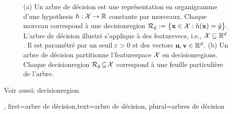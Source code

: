{{\begin{figure}[H]
\begin{minipage}{.45\textwidth}
			\end{minipage}
			\caption{(a) Un arbre de décision est une représentation en organigramme d'une \gls{hypothesis} $h: \mathcal{X} \rightarrow \mathbb{R}$ constante par morceaux.  
				Chaque morceau correspond à une \gls{decisionregion} $\mathcal{R}_{\hat{y}} := \big\{ {\bf x} \in  \mathcal{X}: h({\bf x}) = \hat{y} \big\}$. 
				L'arbre de décision illustré s'applique à des \glspl{featurevec}, i.e., $\mathcal{X} \subseteq \mathbb{R}^{d}$. Il est paramétré par un seuil $\varepsilon>0$ et des \glspl{vector} ${\bf u}, {\bf v} \in \mathbb{R}^{d}$. 
				(b) Un arbre de décision partitionne l'\gls{featurespace} $\mathcal{X}$ en \glspl{decisionregion}. Chaque \gls{decisionregion}  
				$\mathcal{R}_{\hat{y}} \!\subseteq\!\mathcal{X}$ correspond à une feuille particulière de l'arbre.}
			\label{fig_decision_tree_dict}
		\end{figure} 
	Voir aussi: \gls{decisionregion}.
	},
	first={arbre de décision},text={arbre de décision}, plural={arbres de décision}
}

